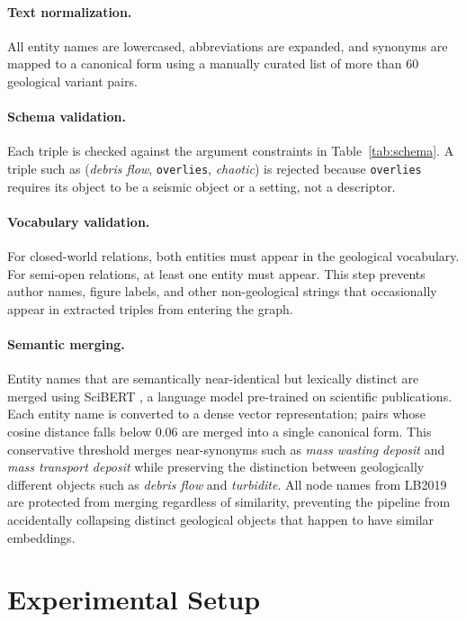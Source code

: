 \documentclass[10pt]{article}
\newcommand{\pred}[1]{\texttt{\small #1}}
\begin{document}
\paragraph{Text normalization.}
All entity names are lowercased, abbreviations are expanded,
and synonyms are mapped to a canonical form using a manually
curated list of more than 60 geological variant pairs.

\paragraph{Schema validation.}
Each triple is checked against the argument constraints in
Table~\ref{tab:schema}.
A triple such as (\emph{debris flow}, \pred{overlies},
\emph{chaotic}) is rejected because \pred{overlies} requires
its object to be a seismic object or a setting, not a
descriptor.

\paragraph{Vocabulary validation.}
For closed-world relations, both entities must appear in the
geological vocabulary.
For semi-open relations, at least one entity must appear.
This step prevents author names, figure labels, and other
non-geological strings that occasionally appear in extracted
triples from entering the graph.

\paragraph{Semantic merging.}
Entity names that are semantically near-identical but
lexically distinct are merged using SciBERT
\citep{beltagy2019scibertpretrainedlanguagemodel}, a language
model pre-trained on scientific publications.
Each entity name is converted to a dense vector
representation; pairs whose cosine distance falls below 0.06
are merged into a single canonical form.
This conservative threshold merges near-synonyms such as
\emph{mass wasting deposit} and \emph{mass transport deposit}
while preserving the distinction between geologically
different objects such as \emph{debris flow} and
\emph{turbidite}.
All node names from LB2019 are protected from merging
regardless of similarity, preventing the pipeline from
accidentally collapsing distinct geological objects that
happen to have similar embeddings.
\section{Experimental Setup}
\label{sec:setup}
\end{document}
